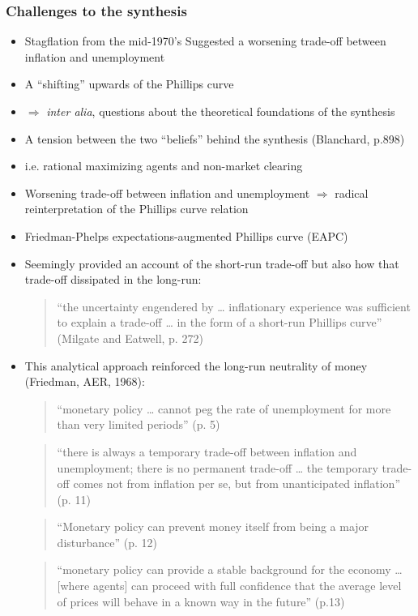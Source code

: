 \documentclass[a4paper,twoside]{article}
\numberwithin{equation}{section}
\numberwithin{figure}{section}
\begin{document}
\subsubsection{Challenges to the synthesis}
	\begin{itemize}
		\item Stagflation from the mid-1970's
		Suggested a worsening trade-off between inflation and unemployment
		\item A “shifting'' upwards of the Phillips curve
		\item \( \Rightarrow \) \textit{inter alia}, questions about the theoretical foundations of the synthesis
		\item A tension between the two “beliefs'' behind the synthesis (Blanchard, p.898) 
		\item i.e. rational maximizing agents and non-market clearing
		\item Worsening trade-off between inflation and unemployment \( \Rightarrow \) radical reinterpretation of the Phillips curve relation
		\item  Friedman-Phelps expectations-augmented Phillips curve (EAPC)
		\item Seemingly provided an account of the short-run trade-off but also how that trade-off dissipated in the long-run:
		\begin{quote}
			``the uncertainty engendered by … inflationary experience was sufficient to explain a trade-off … in the form of a short-run Phillips curve'' (Milgate and Eatwell, p. 272)
		\end{quote}
		\item This analytical approach reinforced the long-run neutrality of money (Friedman, AER, 1968): 
		\begin{quote}
			``monetary policy … cannot peg the rate of unemployment for more than very limited periods'' (p. 5)
		\end{quote}
		\begin{quote}
			``there is always a temporary trade-off between inflation and unemployment; there is no permanent trade-off … the temporary trade-off comes not from inflation per se, but from unanticipated  inflation'' (p. 11)
		\end{quote}
		\begin{quote}
			``Monetary policy can prevent money itself from being a major disturbance'' (p. 12)
		\end{quote}
		\begin{quote}
			``monetary policy can provide a stable background for the economy … [where agents] can proceed with full confidence that the average level of prices will behave in a known way in the future'' (p.13)

\end{quote}
\end{itemize}
\end{document}
